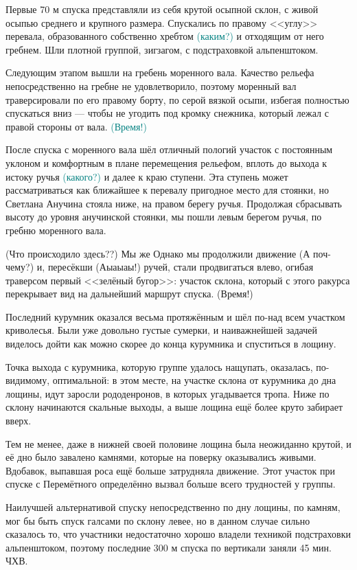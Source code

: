 Первые 70 м спуска представляли из себя крутой осыпной склон, с живой осыпью среднего и крупного размера. Спускались по правому <<углу>> перевала, образованного собственно хребтом \textcolor{teal}{(каким?)} и отходящим от него гребнем. Шли плотной группой, зигзагом, с подстраховкой альпенштоком.  

Следующим этапом вышли на гребень моренного вала. Качество рельефа непосредственно на гребне не удовлетворило, поэтому моренный вал траверсировали по его правому борту, по серой вязкой осыпи, избегая полностью спускаться вниз --- чтобы не угодить под кромку снежника, который лежал с правой стороны от вала. \textcolor{teal}{(Время!)} 

После спуска с моренного вала шёл отличный пологий участок с постоянным уклоном и комфортным в плане перемещения рельефом, вплоть до выхода к истоку ручья \textcolor{teal}{(какого?)} и далее к краю  ступени. Эта ступень может рассматриваться как ближайшее к перевалу пригодное место для стоянки, но Светлана Анучина стояла ниже, на правом берегу ручья. Продолжая сбрасывать высоту до уровня анучинской стоянки, мы пошли левым берегом ручья, по гребню моренного вала. 

\alert{(Что происходило здесь??)} Мы же  Однако мы продолжили движение \alert{(А поч-чему?)} и, пересёкши \alert{(Аыаыаы!)} ручей, стали продвигаться влево, огибая траверсом первый <<зелёный бугор>>: участок склона, который с этого ракурса перекрывает вид на дальнейший маршрут спуска. \alert{(Время!)} 

Последний курумник оказался весьма протяжённым и шёл по-над всем участком криволесья. Были уже довольно густые сумерки, и наиважнейшей задачей виделось дойти как можно скорее до конца курумника и спуститься в лощину. 

Точка выхода с курумника, которую группе удалось нащупать, оказалась, по-видимому, оптимальной: в этом месте, на участке склона от курумника до дна лощины, идут заросли рододенронов, в которых угадывается тропа. Ниже по склону начинаются скальные выходы, а выше лощина ещё более круто забирает вверх. 

Тем не менее, даже в нижней своей половине лощина была неожиданно крутой, и её дно было завалено камнями, которые на поверку оказывались живыми. Вдобавок, выпавшая роса ещё больше затрудняла движение. Этот участок при спуске с Перемётного определённо вызвал больше всего трудностей у группы. 

Наилучшей альтернативой спуску непосредственно по дну лощины, по камням, мог бы быть спуск галсами по склону левее, но в данном случае сильно сказалось то, что участники недостаточно хорошо владели техникой подстраховки альпенштоком, поэтому последние 300 м спуска по вертикали заняли 45 мин. ЧХВ. 

